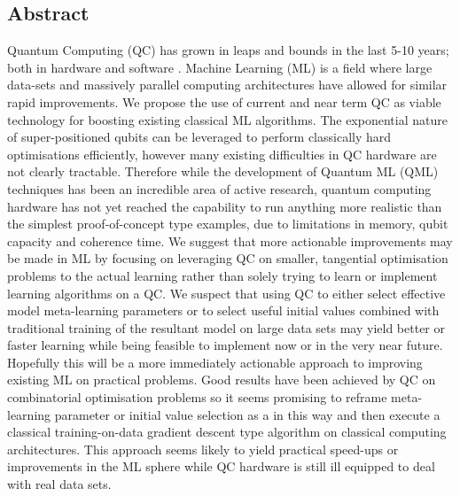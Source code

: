 \documentclass[a0,portrait]{a0poster}
\begin{document}
\begin{multicols}{2} %
\color{Navy} %
\section*{Abstract}
Quantum Computing (QC) has grown in leaps and bounds in the last 5-10 years; both in hardware and software .  Machine Learning (ML) is a field where large data-sets and massively parallel computing architectures have allowed for similar rapid improvements. We propose the use of current and near term QC as viable technology for boosting existing classical ML algorithms. The exponential nature of super-positioned qubits can be leveraged to perform classically hard optimisations efficiently, however many existing difficulties in QC hardware are not clearly tractable.  Therefore while the development of Quantum ML (QML) techniques has been an incredible area of active research, quantum computing hardware has not yet reached the capability to run anything more realistic than the simplest proof-of-concept type examples, due to limitations in memory, qubit capacity and coherence time.  We suggest that more actionable improvements may be made in ML by focusing on leveraging QC on smaller, tangential optimisation problems to the actual learning rather than solely trying to learn or implement learning algorithms on a QC. We suspect that using QC to either select effective model meta-learning parameters or to select useful initial values combined with traditional training of the resultant model on large data sets may yield better or faster learning while being feasible to implement now or in the very near future. Hopefully this will be a more immediately actionable approach to improving existing ML on practical problems. Good results have been achieved by QC on combinatorial optimisation problems so it seems promising to reframe meta-learning parameter or initial value selection as a in this way and then execute a classical training-on-data gradient descent type algorithm on classical computing architectures. This approach seems likely to yield practical speed-ups or improvements in the ML sphere while QC hardware is still ill equipped to deal with real data sets.
\color{SaddleBrown} %

\end{multicols}
\end{document}
